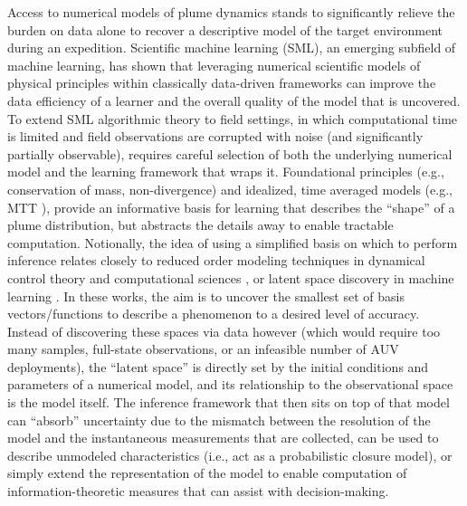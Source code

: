 Access to numerical models of plume dynamics stands to significantly relieve the burden on data alone to recover a descriptive model of the target environment during an expedition.
Scientific machine learning (SML), an emerging subfield of machine learning, has shown that leveraging numerical scientific models of physical principles within classically data-driven frameworks \autocite{raissi2019physics, sapsis2009dynamically, mohan2019compressed,raissi2018numerical,kulkarni2019advection, brunton2016discovering,jiahao2021knowledge} can improve the data efficiency of a learner and the overall quality of the model that is uncovered.
To extend SML algorithmic theory to field settings, in which computational time is limited and field observations are corrupted with noise (and significantly partially observable), requires careful selection of both the underlying numerical model and the learning framework that wraps it.
Foundational principles (e.g., conservation of mass, non-divergence) and idealized, time averaged models (e.g., MTT \autocite{morton1956turbulent}), provide an informative basis for learning that describes the ``shape'' of a plume distribution, but abstracts the details away to enable tractable computation.
Notionally, the idea of using a simplified basis on which to perform inference relates closely to reduced order modeling techniques in dynamical control theory and computational sciences \autocite{lucia2004reduced,burkardt2006pod,salam2019adaptive}, or latent space discovery in machine learning \autocite{voynov2020unsupervised,lu2020extracting}.
In these works, the aim is to uncover the smallest set of basis vectors/functions to describe a phenomenon to a desired level of accuracy.
Instead of discovering these spaces via data however (which would require too many samples, full-state observations, or an infeasible number of AUV deployments), the ``latent space'' is directly set by the initial conditions and parameters of a numerical model, and its relationship to the observational space is the model itself.
The inference framework that then sits on top of that model can ``absorb'' uncertainty due to the mismatch between the resolution of the model and the instantaneous measurements that are collected, can be used to describe unmodeled characteristics (i.e., act as a probabilistic closure model), or simply extend the representation of the model to enable computation of information-theoretic measures that can assist with decision-making.



